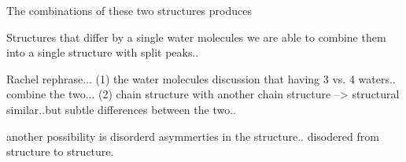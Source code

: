 



The combinations of these two structures produces 

Structures that differ by a single water molecules we are able to combine them into a single structure with split peaks..

Rachel rephrase... 
(1) the water molecules discussion that having 3 vs. 4 waters.. combine the two... 
(2) chain structure with another chain structure --> structural similar..but subtle differences between the two.. 

another possibility is disorderd asymmerties in the structure.. disodered from structure to structure. 




